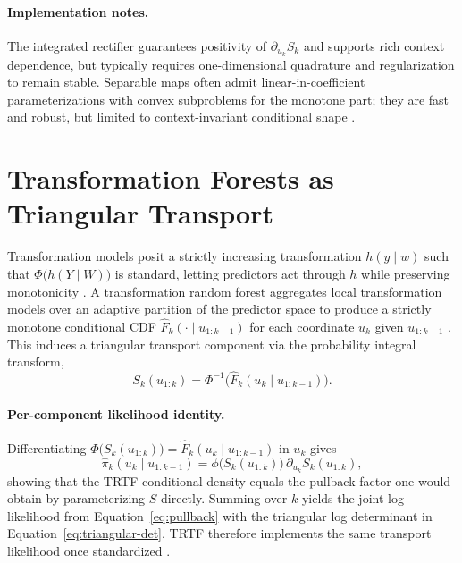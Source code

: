 \documentclass[11pt,a4paper,twoside]{book}\usepackage[]{graphicx}\usepackage[]{xcolor}
\begin{document}
\paragraph{Implementation notes.} The integrated rectifier guarantees positivity of $\partial_{u_k}S_k$ and supports rich context dependence, but typically requires one-dimensional quadrature and regularization to remain stable. Separable maps often admit linear-in-coefficient parameterizations with convex subproblems for the monotone part; they are fast and robust, but limited to context-invariant conditional shape \citep{ramgraber2025friendly}.

\section{Transformation Forests as Triangular Transport}

Transformation models posit a strictly increasing transformation $h(y\mid w)$ such that $\Phi\big(h(Y\mid W)\big)$ is standard, letting predictors act through $h$ while preserving monotonicity \citep{hothorn2018conditional}. A transformation random forest aggregates local transformation models over an adaptive partition of the predictor space to produce a strictly monotone conditional CDF $\widehat F_k(\cdot \mid u_{1:k-1})$ for each coordinate $u_k$ given $u_{1:k-1}$ \citep{hothorn2017transformation,hothorn2021transformation}. This induces a triangular transport component via the probability integral transform,
\begin{equation}
  S_k(u_{1:k}) = \Phi^{-1}\big(\widehat F_k(u_k\mid u_{1:k-1})\big).
  \label{eq:trtf-map-theory}
\end{equation}

\paragraph{Per-component likelihood identity.} Differentiating $\Phi\big(S_k(u_{1:k})\big)=\widehat F_k(u_k\mid u_{1:k-1})$ in $u_k$ gives
\begin{equation}
  \widehat\pi_k(u_k\mid u_{1:k-1}) = \phi\big(S_k(u_{1:k})\big)\, \partial_{u_k}S_k(u_{1:k}),
  \label{eq:trtf-likelihood-theory}
\end{equation}
showing that the TRTF conditional density equals the pullback factor one would obtain by parameterizing $S$ directly. Summing over $k$ yields the joint log likelihood from Equation~\eqref{eq:pullback} with the triangular log determinant in Equation~\eqref{eq:triangular-det}. TRTF therefore implements the same transport likelihood once standardized \citep{hothorn2017transformation,hothorn2021transformation,ramgraber2025friendly}.
\end{document}
